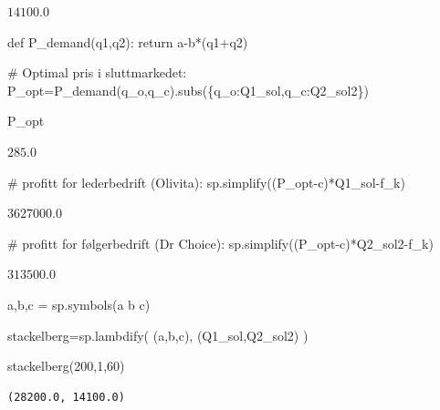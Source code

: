 \documentclass[
  12pt,
  a4paper,
  DIV=11,
  numbers=noendperiod]{scrartcl}
\newenvironment{Shaded}{\begin{snugshade}}{\end{snugshade}}
\newcommand{\CommentTok}[1]{\textcolor[rgb]{0.37,0.37,0.37}{#1}}
\newcommand{\ControlFlowTok}[1]{\textcolor[rgb]{0.00,0.23,0.31}{#1}}
\newcommand{\DecValTok}[1]{\textcolor[rgb]{0.68,0.00,0.00}{#1}}
\newcommand{\KeywordTok}[1]{\textcolor[rgb]{0.00,0.23,0.31}{#1}}
\newcommand{\NormalTok}[1]{\textcolor[rgb]{0.00,0.23,0.31}{#1}}
\newcommand{\OperatorTok}[1]{\textcolor[rgb]{0.37,0.37,0.37}{#1}}
\newcommand{\StringTok}[1]{\textcolor[rgb]{0.13,0.47,0.30}{#1}}
\begin{document}
$\displaystyle 14100.0$

\begin{Shaded}
\begin{Highlighting}[]
\KeywordTok{def}\NormalTok{ P\_demand(q1,q2):}
    \ControlFlowTok{return}\NormalTok{ a}\OperatorTok{{-}}\NormalTok{b}\OperatorTok{*}\NormalTok{(q1}\OperatorTok{+}\NormalTok{q2)}
    
\CommentTok{\# Optimal pris i sluttmarkedet:}
\NormalTok{P\_opt}\OperatorTok{=}\NormalTok{P\_demand(q\_o,q\_c).subs(\{q\_o:Q1\_sol,q\_c:Q2\_sol2\})}

\NormalTok{P\_opt}
\end{Highlighting}
\end{Shaded}

$\displaystyle 285.0$

\begin{Shaded}
\begin{Highlighting}[]
\CommentTok{\# profitt for lederbedrift (Olivita):}
\NormalTok{sp.simplify((P\_opt}\OperatorTok{{-}}\NormalTok{c)}\OperatorTok{*}\NormalTok{Q1\_sol}\OperatorTok{{-}}\NormalTok{f\_k)}
\end{Highlighting}
\end{Shaded}

$\displaystyle 3627000.0$

\begin{Shaded}
\begin{Highlighting}[]
\CommentTok{\# profitt for følgerbedrift (Dr Choice):}
\NormalTok{sp.simplify((P\_opt}\OperatorTok{{-}}\NormalTok{c)}\OperatorTok{*}\NormalTok{Q2\_sol2}\OperatorTok{{-}}\NormalTok{f\_k)}
\end{Highlighting}
\end{Shaded}

$\displaystyle 313500.0$

\begin{Shaded}
\begin{Highlighting}[]
\NormalTok{a,b,c  }\OperatorTok{=}\NormalTok{ sp.symbols(}\StringTok{\textquotesingle{}a b c\textquotesingle{}}\NormalTok{)}

\NormalTok{stackelberg}\OperatorTok{=}\NormalTok{sp.lambdify(}
\NormalTok{    (a,b,c), }
\NormalTok{    (Q1\_sol,Q2\_sol2)}
\NormalTok{)}

\NormalTok{stackelberg(}\DecValTok{200}\NormalTok{,}\DecValTok{1}\NormalTok{,}\DecValTok{60}\NormalTok{)}
\end{Highlighting}
\end{Shaded}

\begin{verbatim}
(28200.0, 14100.0)
\end{verbatim}
\end{document}

